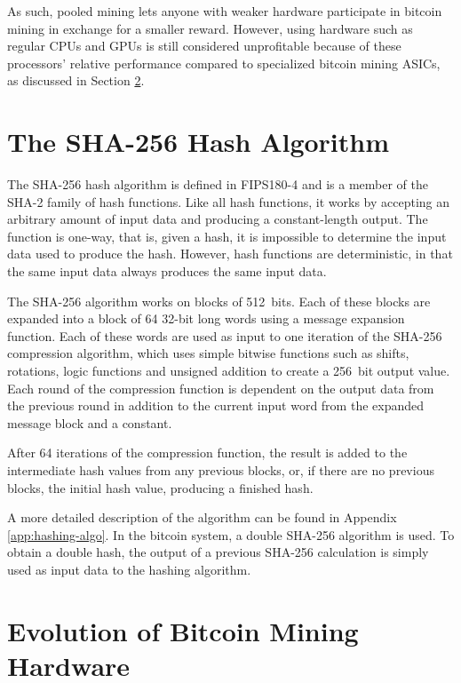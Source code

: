 As such, pooled mining lets anyone with weaker hardware participate in bitcoin mining in exchange for
a smaller reward. However, using hardware such as regular CPUs and GPUs is still considered unprofitable
because of these processors' relative performance compared to specialized bitcoin mining ASICs, as
discussed in Section \ref{sec:bitcoin-history}.

\section{The SHA-256 Hash Algorithm}

The SHA-256 hash algorithm is defined in FIPS180-4 \cite{fips180-4} and is a member of the SHA-2
family of hash functions. Like all hash functions, it works by accepting an arbitrary
amount of input data and producing a constant-length output. The function is one-way,
that is, given a hash, it is impossible to determine the input data used to produce
the hash. However, hash functions are deterministic, in that the same input data always
produces the same input data.

The SHA-256 algorithm works on blocks of 512~bits. Each of these blocks are expanded into a
block of 64 32-bit long words using a message expansion function. Each of these words are
used as input to one iteration of the SHA-256 compression algorithm, which uses simple bitwise functions
such as shifts, rotations, logic functions and unsigned addition to create a 256~bit
output value. Each round of the compression function is dependent on the output data from
the previous round in addition to the current input word from the expanded message block
and a constant.

After 64 iterations of the compression function, the result is added to the intermediate
hash values from any previous blocks, or, if there are no previous blocks, the initial
hash value, producing a finished hash.

A more detailed description of the algorithm can be found in Appendix \ref{app:hashing-algo}.
In the bitcoin system, a double SHA-256 algorithm is used. To obtain a double hash, the
output of a previous SHA-256 calculation is simply used as input data to the hashing
algorithm. \cite{fips180-4}


\section{Evolution of Bitcoin Mining Hardware}
\label{sec:bitcoin-history}

